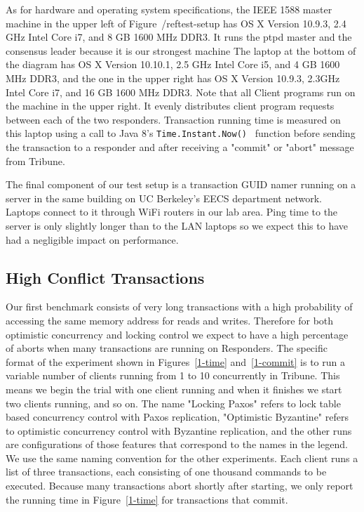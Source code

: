 \documentclass[10pt,twocolumn]{article}
\begin{document}
As for hardware and operating system specifications, the IEEE 1588 master machine in the upper left of Figure~/ref{test-setup} has OS X Version 10.9.3, 2.4 GHz Intel Core i7, and 8 GB 1600 MHz DDR3. It runs the ptpd master and the consensus leader because it is our strongest machine  The laptop at the bottom of the diagram has OS X Version 10.10.1, 2.5 GHz Intel Core i5, and 4 GB 1600 MHz DDR3, and the one in the upper right has OS X Version 10.9.3, 2.3GHz Intel Core i7, and 16 GB 1600 MHz DDR3. Note that all Client programs run on the machine in the upper right. It evenly distributes client program requests between each of the two responders. Transaction running time is measured on this laptop using a call to Java 8's {\tt Time.Instant.Now() } function before sending the transaction to a responder and after receiving a "commit" or "abort" message from Tribune.

The final component of our test setup is a transaction GUID namer running on a server in the same building on UC Berkeley's EECS department network. Laptops connect to it through WiFi routers in our lab area. Ping time to the server is only slightly longer than to the LAN laptops so we expect this to have had a negligible impact on performance.

\subsection{High Conflict Transactions}


Our first benchmark consists of very long transactions with a high probability of accessing the same memory address for reads and writes. Therefore for both optimistic concurrency and locking control we expect to have a high percentage of aborts when many transactions are running on Responders. The specific format of the experiment shown in Figures~\ref{1-time} and~\ref{1-commit} is to run a variable number of clients running from 1 to 10 concurrently in Tribune. This means we begin the trial with one client running and when it finishes we start two clients running, and so on. The name "Locking Paxos" refers to lock table based concurrency control with Paxos replication, "Optimistic Byzantine" refers to optimistic concurrency control with Byzantine replication, and the other runs are configurations of those features that correspond to the names in the legend. We use the same naming convention for the other experiments. Each client runs a list of three transactions, each consisting of one thousand commands to be executed. Because many transactions abort shortly after starting, we only report the running time in Figure~\ref{1-time} for transactions that commit.
\end{document}
